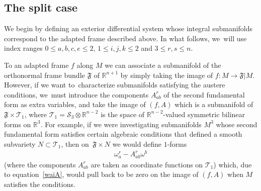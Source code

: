 \documentclass[10pt,a4paper]{amsart}
\def\R{\mathbb{R}}
\def\calS{\mathcal{S}}
\def\calT{\mathcal{T}}
\def\F{\mathfrak{F}}
\def\w{\omega}
\numberwithin{equation}{section}
\begin{document}
\subsection{The split case} \label{splitsec}

We begin by defining an exterior differential system whose integral submanifolds correspond to the adapted frame described above. In what follows, we~will use index ranges $0\le a,b,c,e \le 2$, $1\le i,j,k\le 2$ and $3 \le r,s \le n$.

To an adapted frame $f$ along $M$ we can associate a submanifold of the orthonormal frame bundle $\F$ of $\R^{n+1}$ by simply taking the image of $f\colon M \to \F|M$. However, if we want to~cha\-rac\-te\-rize submanifolds satisfying the austere conditions, we~must introduce the components $A^r_{ab}$ of the second fundamental form as extra variables, and take the image of $(f,A)$ which is a submanifold of $\F \times \calT_1$, where $\calT_1 = \calS_3 \otimes \R^{n-2}$ is the space of $\R^{n-2}$-valued symmetric bilinear forms on $\R^3$. For example, if we were investigating submanifolds $M^3$ whose second fundamental form satisfies certain algebraic conditions that defined a smooth subvariety $N \subset \calT_1$, then on~$\F\times N$ we would define $1$-forms
\begin{gather*}
\w^r_a - A^r_{ab} \w^b
\end{gather*}
(where the components $A^r_{ab}$ are taken as coordinate functions on $\calT_1$) which, due to equation~\eqref{waiA}, would pull back to be zero on the image of $(f,A)$ when $M$ satisfies the conditions.
\end{document}
